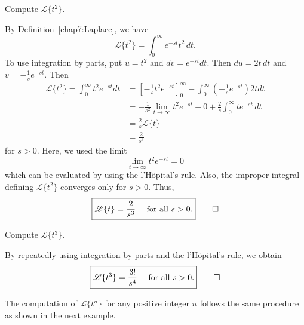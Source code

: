 \begin{example}
	Compute $\mathscr{L}\{t^2\} .$
\end{example}
\begin{solution}
	By Definition~\ref{chap7:Laplace}, we have
		\[
	\mathscr{L}\{t^2\} = \int_0^\infty e^{-st} t^2 \, dt.
	\] 
To use integration by parts, put \(
	u = t^2\)  and \(dv = e^{-st} dt\). Then \( du = 2t\,dt\) and 
	\(v = -\frac{1}{s}e^{-st}\). Then
\begin{equation*}
	\begin{split}
	\mathscr{L}\{t^2\} = \int_0^\infty t^2 e^{-st} dt
						&= \left[ -\frac{1}{s} t^2 e^{-st} \right]_0^\infty - \int_0^\infty \left(-\frac{1}{s}e^{-st}\right) 2t dt\\
						&=-\frac{1}{s^2}\lim_{t\to\infty}t^2 e^{-st} + 0+ \frac{2}{s}\int_0^\infty t e^{-st}\, dt\\
						&=\frac{2}{s} \mathscr{L}\{t\}\\
						&= \frac{2}{s^3}
	\end{split}
\end{equation*}
for $s>0$. Here, we used the limit
\[\lim_{t\to\infty}t^2 e^{-st} =0\] which can be evaluated by using the l'H\"opital's rule. Also, the improper integral defining \(\mathscr{L}\{t^2\}\) converges only for $s>0.$ Thus, 
\[\boxed{\mathscr{L} \{t\} = \frac{2}{s^3}\quad \text{ for all } s>0.}\qedhere\]
\end{solution}


\begin{example}
	Compute $\mathscr{L}\{t^3\} .$
\end{example}
\begin{solution}
By repeatedly using integration by parts and the l'H\"opital's rule, we obtain
\[\boxed{\mathscr{L} \{t^3\} = \frac{3!}{s^4}\quad \text{ for all } s>0.}\qedhere\]
\end{solution}

The computation of \(\mathscr{L}\{t^n\}\) for any positive integer $n$ follows the same procedure as shown in the next example.

